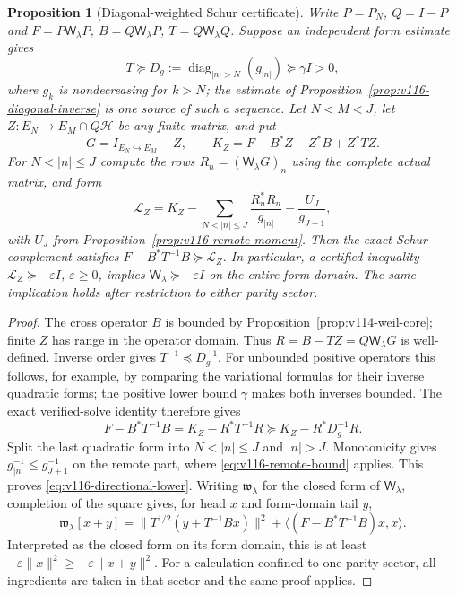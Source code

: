 \documentclass[11pt]{article}
\newtheorem{proposition}[theorem]{Proposition}
\theoremstyle{remark}
\begin{document}
\begin{proposition}[Diagonal-weighted Schur certificate]
\label{prop:v116-directional-schur}
Write $P=P_N$, $Q=I-P$ and
$F=P\mathsf W_\lambda P$, $B=Q\mathsf W_\lambda P$,
$T=Q\mathsf W_\lambda Q$.  Suppose an independent form estimate gives
\[
 T\succeq D_g:=\operatorname{diag}_{|n|>N}(g_{|n|})
       \succeq\gamma I>0,
\]
where $g_k$ is nondecreasing for $k>N$; the estimate of
Proposition~\ref{prop:v116-diagonal-inverse} is one source of such a
sequence.  Let $N<M<J$, let $Z:E_N\to E_M\cap Q\mathcal H$ be any
finite matrix, and put
\[
 G=I_{E_N\hookrightarrow E_M}-Z,\qquad
 K_Z=F-B^*Z-Z^*B+Z^*TZ.
\]
For $N<|n|\le J$ compute the rows
$R_n=(\mathsf W_\lambda G)_n$ using the complete actual matrix,
and form
\begin{equation}\label{eq:v116-directional-lower}
 \mathcal L_Z=K_Z-
     \sum_{N<|n|\le J}\frac{R_n^*R_n}{g_{|n|}}
                    -\frac{U_J}{g_{J+1}},
\end{equation}
with $U_J$ from Proposition~\ref{prop:v116-remote-moment}.
Then the exact Schur complement satisfies
$F-B^*T^{-1}B\succeq\mathcal L_Z$.
In particular, a certified inequality
$\mathcal L_Z\succeq-\varepsilon I$, $\varepsilon\ge0$, implies
$\mathsf W_\lambda\succeq-\varepsilon I$ on the entire form domain.
The same implication holds after restriction to either parity sector.
\end{proposition}
\begin{proof}
The cross operator $B$ is bounded by
Proposition~\ref{prop:v114-weil-core}; finite $Z$ has range in the
operator domain.  Thus $R=B-TZ=Q\mathsf W_\lambda G$ is well-defined.
Inverse order gives $T^{-1}\preceq D_g^{-1}$.  For unbounded
positive operators this follows, for example, by comparing the
variational formulas for their inverse quadratic forms; the positive
lower bound $\gamma$ makes both inverses bounded.  The exact
verified-solve identity therefore gives
\[
 F-B^*T^{-1}B=K_Z-R^*T^{-1}R
                  \succeq K_Z-R^*D_g^{-1}R.
\]
Split the last quadratic form into $N<|n|\le J$ and $|n|>J$.
Monotonicity gives $g_{|n|}^{-1}\le g_{J+1}^{-1}$ on the remote part,
where \eqref{eq:v116-remote-bound} applies.  This proves
\eqref{eq:v116-directional-lower}.  Writing $\mathfrak w_\lambda$ for the closed form of
$\mathsf W_\lambda$, completion of the square gives, for head $x$
and form-domain tail $y$,
\[
 \mathfrak w_\lambda[x+y]
 =\|T^{1/2}(y+T^{-1}Bx)\|^2
       +\langle(F-B^*T^{-1}B)x,x\rangle.
\]
Interpreted as the closed form on its form domain, this is at least
$-\varepsilon\|x\|^2\ge-\varepsilon\|x+y\|^2$.
For a calculation confined to one parity sector, all ingredients
are taken in that sector and the same proof applies.
\end{proof}
\end{document}
